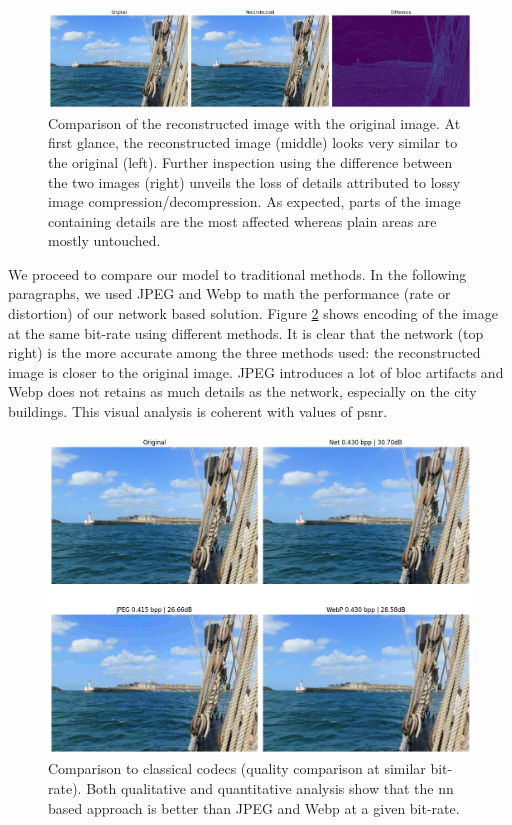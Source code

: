\begin{figure}
    \centering
    \includegraphics[width=15cm]{img/balle_repro_1.png}
    \caption[Comparison of the reconstructed image with the original image.]{Comparison of the reconstructed image with the original image. At first glance, the reconstructed image (middle) looks very similar to the original (left). Further inspection using the difference between the two images (right) unveils the loss of details attributed to lossy image compression/decompression. As expected, parts of the image containing details are the most affected whereas plain areas are mostly untouched.}
    \label{balle_repro_1}
\end{figure}

We proceed to compare our model to traditional methods. In the following paragraphs, we used JPEG and Webp to math the performance (rate or distortion) of our network based solution. Figure \ref{balle_repro_2} shows encoding of the image at the same bit-rate using different methods. It is clear that the network (top right) is the more accurate among the three methods used: the reconstructed image is closer to the original image. JPEG introduces a lot of bloc artifacts and Webp does not retains as much details as the network, especially on the city buildings. This visual analysis is coherent with values of \acrshort{psnr}.

\begin{figure}
    \centering
    \includegraphics[width=15cm]{img/balle_repro_2.png}
    \caption[Comparison to classical codecs (quality comparison at similar bit-rate).]{Comparison to classical codecs (quality comparison at similar bit-rate). Both qualitative and quantitative analysis show that the \acrshort{nn} based approach is better than JPEG and Webp at a given bit-rate.}
    \label{balle_repro_2}
\end{figure}

